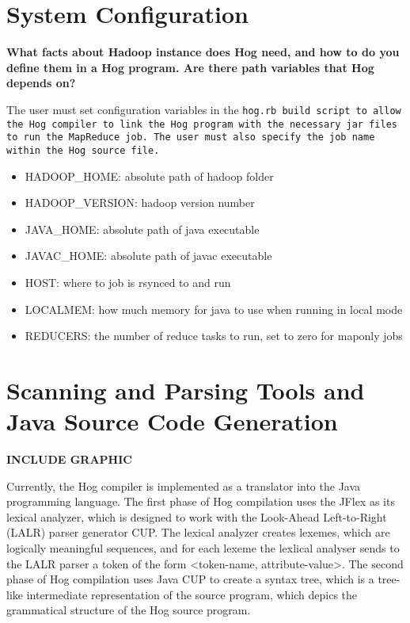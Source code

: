 \documentclass{book}
\begin{document}
\chapter{System Configuration} %
\label{cha:system_configuration}

\textbf{What facts about Hadoop instance does Hog need, and how to do you define
them in a Hog program. Are there path variables that Hog depends on?}

The user must set configuration variables in the \tt hog.rb \rm build script to
allow the Hog compiler to link the Hog program with the necessary jar files to run
the MapReduce job. The user must also specify the job name within the Hog source
file.

\begin{itemize}

\item[] HADOOP\_HOME: absolute path of hadoop folder
\item[] HADOOP\_VERSION: hadoop version number
\item[] JAVA\_HOME: absolute path of java executable
\item[] JAVAC\_HOME: absolute path of javac executable
\item[] HOST: where to job is rsynced to and run
\item[] LOCALMEM: how much memory for java to use when running in local mode 
\item[] REDUCERS: the number of reduce tasks to run, set to zero for map­only jobs

\end{itemize}


\chapter{Scanning and Parsing Tools and Java Source Code Generation} %
\label{cha:parsing_tools}

\textbf{INCLUDE GRAPHIC}

Currently, the Hog compiler is implemented as a translator into the Java programming 
language. The first phase of Hog compilation uses the JFlex as its lexical analyzer,
which is designed to work with the Look-Ahead Left-to-Right (LALR) parser generator
CUP. The lexical analyzer creates lexemes, which are logically meaningful sequences,
and for each lexeme the lexlical analyser sends to the LALR parser a token of the
form <token-name, attribute-value>. The second phase of Hog compilation uses Java CUP
to create a syntax tree, which is a tree-like intermediate representation of the source
program, which depics the grammatical structure of the Hog source program.
\end{document}
